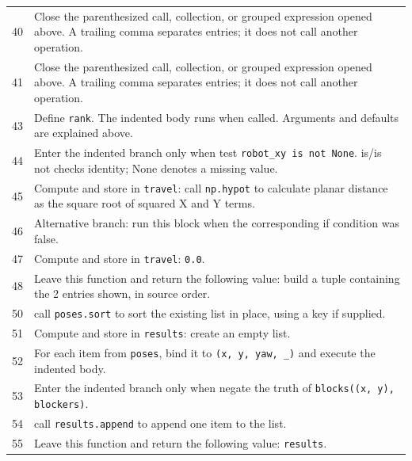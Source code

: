 \documentclass[11pt,a4paper]{book}
\begin{document}
\begin{longtable}{r p{}}
40 & Close the parenthesized call, collection, or grouped expression opened above. A trailing comma separates entries; it does not call another operation. \\

41 & Close the parenthesized call, collection, or grouped expression opened above. A trailing comma separates entries; it does not call another operation. \\

43 & Define \texttt{rank}. The indented body runs when called. Arguments and defaults are explained above. \\

44 & Enter the indented branch only when test \texttt{robot\_xy is not None}. is/is not checks identity; None denotes a missing value. \\

45 & Compute and store in \texttt{travel}: call \texttt{np.hypot} to calculate planar distance as the square root of squared X and Y terms.  \\

46 & Alternative branch: run this block when the corresponding if condition was false. \\

47 & Compute and store in \texttt{travel}: \texttt{0.0}.  \\

48 & Leave this function and return the following value: build a tuple containing the 2 entries shown, in source order. \\

50 & call \texttt{poses.sort} to sort the existing list in place, using a key if supplied. \\

51 & Compute and store in \texttt{results}: create an empty list.  \\

52 & For each item from \texttt{poses}, bind it to \texttt{(x, y, yaw, \_)} and execute the indented body. \\

53 & Enter the indented branch only when negate the truth of \texttt{blocks((x, y), blockers)}. \\

54 & call \texttt{results.append} to append one item to the list. \\

55 & Leave this function and return the following value: \texttt{results}. \\

\end{longtable}
\end{document}
